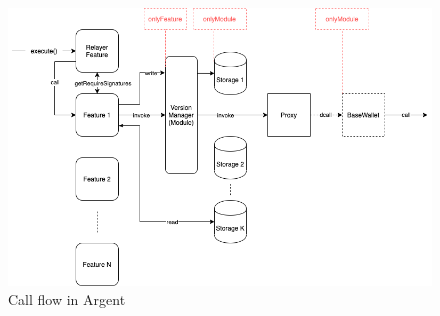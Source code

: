 \documentclass[12pt]{article}
\begin{document}
\begin{figure}[h]
    \label{fig:sc-flow}
    \includegraphics[width=\textwidth]{SC_Flow_2_x_final_}
    \caption{Call flow in Argent}
\end{figure}
\end{document}
